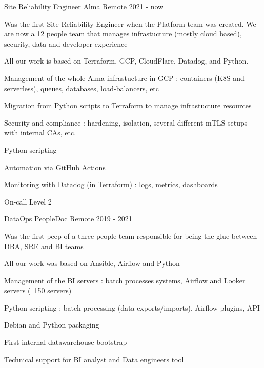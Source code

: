 


\begin{cventries}


\cventry
{Site Reliability Engineer} %
{Alma} %
{Remote} %
{2021 - now} %
{ %
\begin{cvitems}
\item {Was the first Site Reliability Engineer when the Platform team was created. We are now a 12 people team that manages infrastucture (mostly cloud based), security, data and developer experience}
\item {All our work is based on Terraform, GCP, CloudFlare, Datadog, and Python.}
\item {Management of the whole Alma infrastucture in GCP : containers (K8S and serverless), queues, databases, load-balancers, etc}
\item {Migration from Python scripts to Terraform to manage infrastucture resources}
\item {Security and compliance : hardening, isolation, several different mTLS setups with internal CAs, etc.}
\item {Python scripting}
\item {Automation via GitHub Actions}
\item {Monitoring with Datadog (in Terraform) : logs, metrics, dashboards}
\item {On-call Level 2}
\end{cvitems}
}


\cventry
{DataOps} %
{PeopleDoc} %
{Remote} %
{2019 - 2021} %
{ %
\begin{cvitems}
\item {Was the first peep of a three people team responsible for being the glue between DBA, SRE and BI teams}
\item {All our work was based on Ansible, Airflow and Python}
\item Management of the BI servers : batch processes systems, Airflow and Looker servers (~150 servers)
\item Python scripting : batch processing (data exports/imports), Airflow plugins, API
\item Debian and Python packaging
\item First internal datawarehouse bootstrap
\item Technical support for BI analyst and Data engineers tool
\end{cvitems}
}


\end{cventries}
